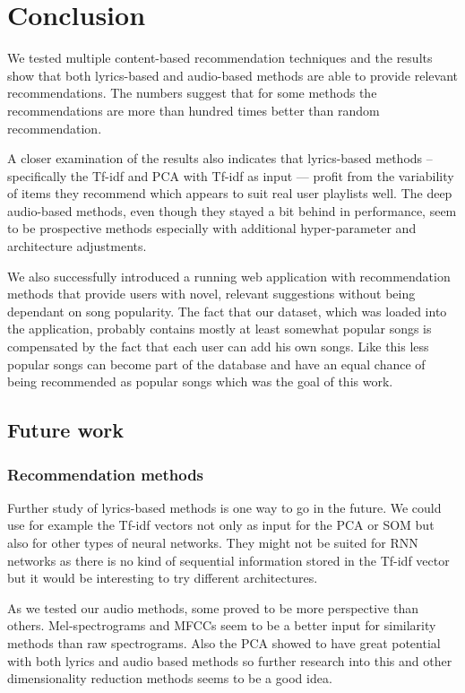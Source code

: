 \chapter*{Conclusion}
We tested multiple content-based recommendation techniques and the results show that both lyrics-based and audio-based methods are able to provide relevant recommendations. The numbers suggest that for some methods the recommendations are more than hundred times better than random recommendation. 

A closer examination of the results also indicates that lyrics-based methods -- specifically the Tf-idf and PCA with Tf-idf as input --- profit from the variability of items they recommend which appears to suit real user playlists well. The deep audio-based methods, even though they stayed a bit behind in performance, seem to be prospective methods especially with additional hyper-parameter and architecture adjustments. 

We also successfully introduced a running web application with recommendation methods that provide users with novel, relevant suggestions without being dependant on song popularity. The fact that our dataset, which was loaded into the application, probably contains mostly at least somewhat popular songs is compensated by the fact that each user can add his own songs. Like this less popular songs can become part of the database and have an equal chance of being recommended as popular songs which was the goal of this work. 

\section*{Future work}
\subsection*{Recommendation methods}
Further study of lyrics-based methods is one way to go in the future. We could use for example the Tf-idf vectors not only as input for the PCA or SOM but also for other types of neural networks. They might not be suited for RNN networks as there is no kind of sequential information stored in the Tf-idf vector but it would be interesting to try different architectures.

As we tested our audio methods, some proved to be more perspective than others. Mel-spectrograms and MFCCs seem to be a better input for similarity methods than raw spectrograms. Also the PCA showed to have great potential with both lyrics and audio based methods so further research into this and other dimensionality reduction methods seems to be a good idea. 

